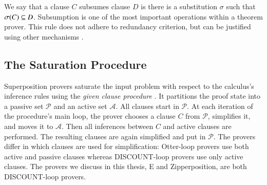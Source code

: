 We say that a clause $C$ subsumes clause $D$ is there is a substitution $\sigma$
such that $\sigma(C) \subseteq D$. Subsumption is one of the most important
operations within a theorem prover. This rule does not adhere to redundancy
criterion, but can be justified using other mechanisms \cite{wtrb-20-sat-framework}.

\subsection{The Saturation Procedure}
\label{sec:pre:saturation}

Superposition provers saturate the input problem with respect to the calculus's
inference rules using the \emph{given clause procedure}
\cite{mcw-1997-otter,adf-1995-discount}. It partitions the proof state into a
passive set $\mathcal{P}$ and an active set $\mathcal{A}$. All clauses start in
$\mathcal{P}$. At each iteration of the procedure's main loop, the prover
chooses a clause $C$ from $\mathcal{P}$, simplifies it, and moves it to
$\mathcal{A}$. Then all inferences between $C$ and active clauses are performed.
The resulting clauses are again simplified and put in $\mathcal{P}$.
The provers differ in which clauses are used for simplification: Otter-loop
\cite{mcw-1997-otter} provers use both active and passive clauses whereas
DISCOUNT-loop \cite{adf-1995-discount} provers use only active clauses.
The provers we discuss in this thesis, E and Zipperposition, are both DISCOUNT-loop provers.
